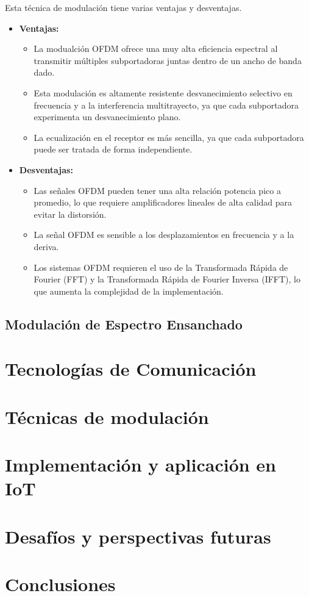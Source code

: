 \documentclass[12pt, letterpaper]{article}
\begin{document}
Esta técnica de modulación tiene varias ventajas y desventajas.
\begin{itemize}
    \item \textbf{Ventajas:}
    \begin{itemize}
        \item La modualción OFDM ofrece una muy alta eficiencia espectral al transmitir múltiples subportadoras juntas dentro de un ancho de banda dado.
        \item Esta modulación es altamente resistente desvanecimiento selectivo en frecuencia y a la interferencia multitrayecto, ya que cada subportadora experimenta un desvanecimiento plano.
        \item La ecualización en el receptor es más sencilla, ya que cada subportadora puede ser tratada de forma independiente.
    \end{itemize}

    \item \textbf{Desventajas:}
    \begin{itemize}
        \item Las señales OFDM pueden tener una alta relación potencia pico a promedio, lo que requiere amplificadores lineales de alta calidad para evitar la distorsión.
        \item La señal OFDM es sensible a los desplazamientos en frecuencia y a la deriva.
        \item Los sistemas OFDM requieren el uso de la Transformada Rápida de Fourier (FFT) y la Transformada Rápida de Fourier Inversa (IFFT), lo que aumenta la complejidad de la implementación.
    \end{itemize}
\end{itemize}

\subsection{Modulación de Espectro Ensanchado}

\section{Tecnologías de Comunicación}

\newpage
\section{Técnicas de modulación}

\newpage
\section{Implementación y aplicación en IoT}

\newpage
\section{Desafíos y perspectivas futuras}

\newpage
\section{Conclusiones}
\end{document}
